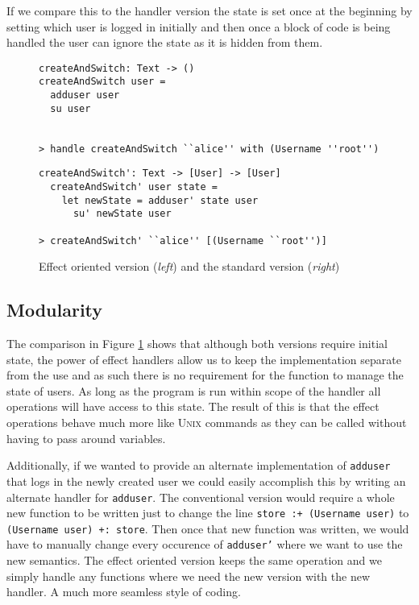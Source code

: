 \documentclass[logo,bsc,singlespacing,parskip]{infthesis}
\begin{document}
If we compare this to the handler version the state is set once at the beginning
by setting which user is logged in initially and then once a block of code is
being handled the user can ignore the state as it is hidden from them.


\begin{figure}[h]
\begin{minipage}{0.5\textwidth}

\begin{lstlisting}[style=terminal]
createAndSwitch: Text -> ()
createAndSwitch user =
  adduser user
  su user


> handle createAndSwitch ``alice'' with (Username ''root'')

\end{lstlisting}

\end{minipage}%
\begin{minipage}{0.5\textwidth}


\begin{lstlisting}[style=terminal]
  createAndSwitch': Text -> [User] -> [User]
  createAndSwitch' user state =
    let newState = adduser' state user
      su' newState user

> createAndSwitch' ``alice'' [(Username ``root'')]

\end{lstlisting}
\end{minipage}
\caption{Effect oriented version (\emph{left}) and the standard version (\emph{right})}
  \label{fig:seqvshandler}
\end{figure}

\subsection{Modularity}

The comparison in Figure \ref{fig:seqvshandler} shows that although both versions require initial state,
the power of effect handlers allow us to keep the implementation separate from
the use and as such there is no requirement for the function to manage the state of
users. As long as the program is run within scope of the handler all operations
will have access to this state. The result of this is that the effect operations
behave much more like \textsc{Unix} commands as they can be called without
having to pass around variables.

Additionally, if we wanted to provide an alternate implementation of
\texttt{adduser} that logs in the newly created user we could easily accomplish
this by writing an alternate handler for \texttt{adduser}. The conventional
version would require a whole new function to be written just to change the line
\texttt{store :+ (Username user)} to \texttt{(Username user) +: store}. Then
once that new function was written, we would have to manually change every
occurence of \texttt{adduser'} where we want to use the new semantics. The
effect oriented version keeps the same operation and we simply handle any
functions where we need the new version with the new handler. A much more
seamless style of coding.
\end{document}
